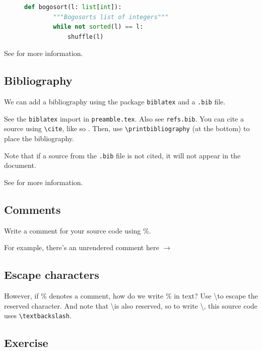 \documentclass{article}
\begin{document}
\begin{figure}[h]
    \centering
    \begin{lstlisting}[language=Python]
    def bogosort(l: list[int]):
        """Bogosorts list of integers"""
        while not sorted(l) == l:
            shuffle(l)
    \end{lstlisting} 
\end{figure}

See \cite{overleaf_code} for more information.

\subsection{Bibliography}

We can add a bibliography using the package \texttt{biblatex} and a \texttt{.bib} file.

See the \texttt{biblatex} import in \texttt{preamble.tex}. Also see \texttt{refs.bib}. You can cite a source using \texttt{\textbackslash cite}, like so \cite{latex_vid_1} \cite{latex_vid_2}. Then, use \texttt{\textbackslash printbibliography} (at the bottom) to place the bibliography.

Note that if a source from the \texttt{.bib} file is not cited, it will not appear in the document.

See \cite{overleaf_bibliography} for more information.

\subsection{Comments}

Write a comment for your source code using \%.

For example, there's an unrendered comment here $\rightarrow$ %

\subsection{Escape characters}

However, if \% denotes a comment, how do we write \% in text? Use \textbackslash to escape the reserved character. And note that \textbackslash is also reserved, so to write \textbackslash, this source code uses \texttt{\textbackslash textbackslash}.

\subsection{Exercise}
\end{document}
